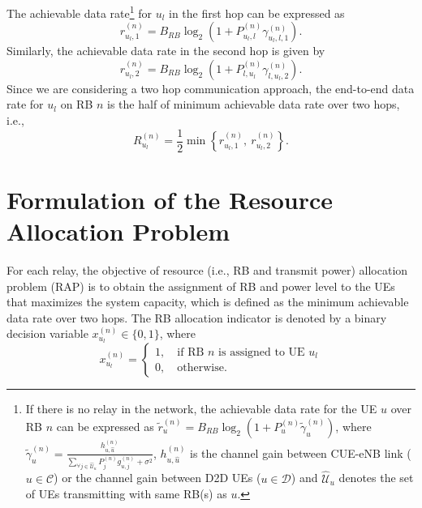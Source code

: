 \documentclass[twocolumn,10pt]{IEEEtran}
\begin{document}
The achievable data rate\footnote{If there is no relay in the network, the achievable data rate for the UE $u$ over RB $n$ can be expressed as $\widetilde{r}_{u}^{(n)} = B_{RB} \log_2 \left( 1 + P_{u}^{(n)} \tilde{\gamma}_{u}^{(n)} \right)$, where $\tilde{\gamma}_{u}^{(n)}  = \frac{h_{u, \hat{u}}^{(n)}}{\displaystyle \sum_{\forall j \in \hat{{\mathcal U}}_u} P_{j}^{(n)} g_{u, j}^{(n)} + \sigma^2} $, $h_{u, \hat{u}}^{(n)}$ is the channel gain between CUE-eNB link ($u \in \mathcal{C}$) or the channel gain between D2D UEs ($u \in \mathcal{D}$) and  $\hat{{\mathcal U}}_u$ denotes the set of UEs transmitting with same RB(s) as $u$.} for $u_l$ in the first hop can be expressed as $$r_{u_l, 1}^{(n)} = B_{RB} \log_2 \left( 1 + P_{u_l, l}^{(n)} \gamma_{u_l, l, 1}^{(n)} \right).$$ Similarly, the achievable data rate in the second hop is given by $$r_{u_l, 2}^{(n)} = 
B_{RB} \log_2 \left( 1 + P_{l, u_l}^{(n)} \gamma_{l, u_l, 2}^{(n)} \right).$$ Since we are considering a two hop communication approach, the end-to-end data rate for  $u_l$ on RB $n$ is the half of minimum achievable data rate over two hops, i.e.,   
\begin{equation}
\label{eqn:e2e_rate}
R_{u_l}^{(n)} =  \frac{1}{2} \min \left\lbrace  r_{u_l, 1}^{(n)} ,~ r_{u_l, 2}^{(n)}    \right\rbrace.
\end{equation}

\section{Formulation of the Resource Allocation Problem} 
\label{sec:RAP}


For each relay, the objective of resource (i.e., RB and transmit power) allocation problem (RAP) is to obtain  the assignment of RB and power level to the UEs that maximizes the system capacity, which is defined as the minimum achievable data rate over two hops. The RB allocation indicator is denoted by a binary decision variable $x_{u_l}^{(n)} \in \lbrace 0, 1\rbrace$, where 
\begin{equation}
x_{u_l}^{(n)}  = \begin{cases}
 1, \quad  \text{if RB $n$ is assigned to UE $u_l$} \\
 0, \quad \text{otherwise.}
\end{cases}
\end{equation}
\end{document}
